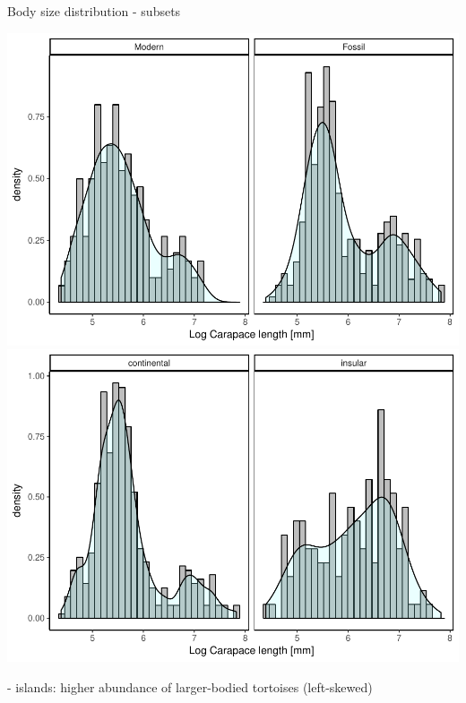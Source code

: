 \begin{frame}{Body size distribution - subsets}
\begin{center}
		\includegraphics[scale=0.3]{MA_JJ_files/figure-latex/HistFosMo-1.pdf}
		\includegraphics[scale=0.3]{MA_JJ_files/figure-latex/HistCI-1.pdf}	
	
\end{center}

- islands: higher abundance of larger-bodied tortoises (left-skewed)
\end{frame}


